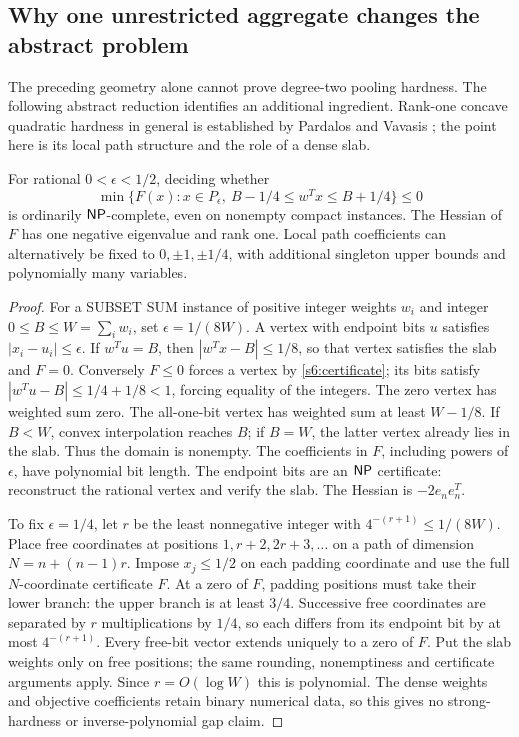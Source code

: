 \subsection{Why one unrestricted aggregate changes the abstract problem}
\label{s6:slab}
The preceding geometry alone cannot prove degree-two pooling hardness.
The following abstract reduction identifies an additional ingredient.
Rank-one concave quadratic hardness in general is established by
Pardalos and Vavasis \cite{s6:pardalos1991}; the point here is its local
path structure and the role of a dense slab.

\begin{proposition}\label{s6:slab-hardness}
For rational $0<\epsilon<1/2$, deciding whether
\[
 \min\{F(x):x\in P_\epsilon,\ B-1/4\le w^Tx\le B+1/4\}\le0
\]
is ordinarily $\mathsf{NP}$-complete, even on nonempty compact instances.
The Hessian of $F$ has one negative eigenvalue and rank one. Local
path coefficients can alternatively be fixed to $0,\pm1,\pm1/4$,
with additional singleton upper bounds and polynomially many variables.
\end{proposition}
\begin{proof}
For a SUBSET SUM instance of positive integer weights $w_i$ and integer
$0\le B\le W=\sum_iw_i$, set $\epsilon=1/(8W)$. A vertex with
endpoint bits $u$ satisfies $|x_i-u_i|\le\epsilon$.
If $w^Tu=B$, then $|w^Tx-B|\le1/8$, so that vertex satisfies the
slab and $F=0$. Conversely $F\le0$ forces a vertex by
\cref{s6:certificate}; its bits satisfy
$|w^Tu-B|\le1/4+1/8<1$, forcing equality of the integers.
The zero vertex has weighted sum zero. The all-one-bit vertex has
weighted sum at least $W-1/8$. If $B<W$, convex interpolation reaches
$B$; if $B=W$, the latter vertex already lies in the slab.
Thus the domain is nonempty. The coefficients in $F$, including powers
of $\epsilon$, have polynomial bit length. The endpoint bits are an
$\mathsf{NP}$ certificate: reconstruct the rational vertex and verify the slab.
The Hessian is $-2e_ne_n^T$.

To fix $\epsilon=1/4$, let $r$ be the least nonnegative integer with
$4^{-(r+1)}\le1/(8W)$. Place free coordinates at positions
$1,r+2,2r+3,\ldots$ on a path of dimension $N=n+(n-1)r$.
Impose $x_j\le1/2$ on each padding coordinate and use the full
$N$-coordinate certificate $F$. At a zero of $F$, padding positions
must take their lower branch: the upper branch is at least $3/4$.
Successive free coordinates are separated by $r$ multiplications by
$1/4$, so each differs from its endpoint bit by at most $4^{-(r+1)}$.
Every free-bit vector extends uniquely to a zero of $F$. Put the slab
weights only on free positions; the same rounding, nonemptiness and
certificate arguments apply. Since $r=O(\log W)$ this is polynomial.
The dense weights and objective coefficients retain binary numerical
data, so this gives no strong-hardness or inverse-polynomial gap claim.
\end{proof}

